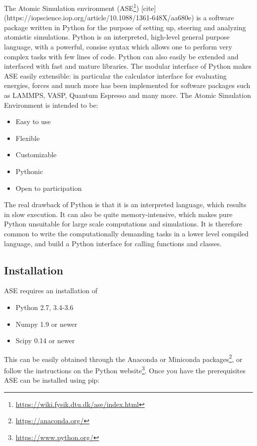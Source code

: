 The Atomic Simulation environment (ASE\footnote{
\url{https://wiki.fysik.dtu.dk/ase/index.html}})
[cite](https://iopscience.iop.org/article/10.1088/1361-648X/aa680e)
is a software package written in Python for the purpose
of setting up, steering and analyzing atomistic simulations.
Python is an interpreted, high-level general purpose language,
with a powerful, consise syntax which allows one to perform
very complex tasks with few lines of code. Python can also
easily be extended and interfaced with fast and mature
libraries. The modular interface of Python makes ASE
easily extensible: in particular the calculator interface
for evaluating energies, forces and much more has been
implemented for software packages such as LAMMPS, VASP,
Quantum Espresso and many more.
The Atomic Simulation Environment is intended to be:

\begin{itemize}
    \item Easy to use
    \item Flexible
    \item Customizable
    \item Pythonic
    \item Open to participation
\end{itemize}

The real drawback of Python is that it is an interpreted language,
which results in slow execution. It can also be quite memory-intensive,
which makes pure Python unsuitable for large scale computations
and simulations. It is therefore common to write the
computationally demanding tasks in a lower level compiled language,
and build a Python interface for calling functions and classes.

\subsection{Installation}
ASE requires an installation of

\begin{itemize}
    \item Python 2.7, 3.4-3.6
    \item Numpy 1.9 or newer
    \item Scipy 0.14 or newer
\end{itemize}

This can be easily obtained through the Anaconda 
or Miniconda packages\footnote{\url{https://anaconda.org/}},
or follow the instructions on the Python website\footnote{
\url{https://www.python.org/}}.
Once you have the prerequisites ASE can be installed using pip:

